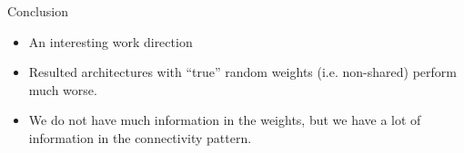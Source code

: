 \documentclass[handout, 10pt]{beamer}
\begin{document}
\begin{frame}{Conclusion}
    \begin{itemize}
        \item An interesting work direction
        \item Resulted architectures with ``true'' random weights (i.e. non-shared) perform much worse.
        \item We do not have much information in the weights, but we have a lot of information in the connectivity pattern.
    \end{itemize}
\end{frame}
\end{document}
